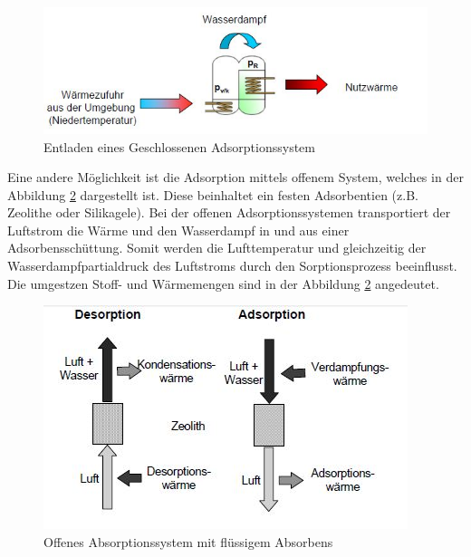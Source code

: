 \documentclass[11pt,a4paper]{scrartcl}
\begin{document}
\begin{figure}[h!]
\begin{center}
\includegraphics[scale=0.6]{images/geschlossenerentladen.jpg}
\caption{Entladen eines Geschlossenen Adsorptionssystem \cite{zeosys}}
\label{fig:geschlossenerentladen}
\end{center}
\end{figure}


Eine andere Möglichkeit ist die Adsorption mittels offenem System, welches in
der Abbildung \ref{fig:offenessystemadsorption} dargestellt ist. Diese
beinhaltet ein festen Adsorbentien (z.B. Zeolithe oder Silikagele).  Bei der
offenen Adsorptionssystemen transportiert der Luftstrom die Wärme und den
Wasserdampf in und aus einer Adsorbensschüttung. Somit werden die Lufttemperatur
und gleichzeitig der Wasserdampfpartialdruck des Luftstroms durch den
Sorptionsprozess beeinflusst. Die umgestzen Stoff- und Wärmemengen sind in der
Abbildung \ref{fig:offenessystemadsorption} angedeutet.


\begin{figure}[h!]
\begin{center}
\includegraphics[scale=1]{images/offenessystemadsorption.jpg}
\caption{Offenes Absorptionssystem mit flüssigem Absorbens}
\label{fig:offenessystemadsorption}
\end{center}
\end{figure}
\end{document}
